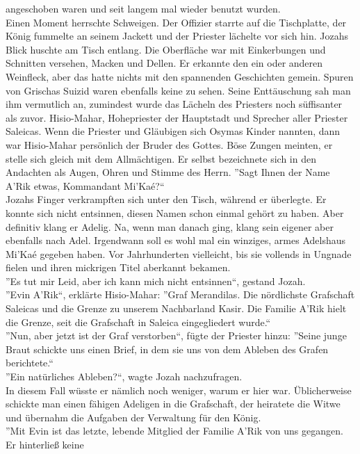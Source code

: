 angeschoben waren und seit langem mal wieder benutzt wurden. \\
Einen Moment herrschte Schweigen. Der Offizier starrte auf die Tischplatte, der König fummelte an 
seinem Jackett und der Priester lächelte vor sich hin. Jozahs Blick huschte am Tisch entlang. Die 
Oberfläche war mit Einkerbungen und Schnitten versehen, Macken und Dellen. Er erkannte den ein oder 
anderen Weinfleck, aber das hatte nichts mit den spannenden Geschichten gemein. Spuren von Grischas 
Suizid waren ebenfalls keine zu sehen. Seine Enttäuschung sah man ihm vermutlich an, zumindest 
wurde das Lächeln des Priesters noch süffisanter als zuvor. Hisio-Mahar, Hohepriester der 
Hauptstadt und Sprecher aller Priester Saleicas. Wenn die Priester und Gläubigen sich Osymas Kinder 
nannten, dann war Hisio-Mahar persönlich der Bruder des Gottes. Böse Zungen meinten, er stelle sich 
gleich mit dem Allmächtigen. Er selbst bezeichnete sich in den Andachten als Augen, Ohren und Stimme 
des Herrn. ''Sagt Ihnen der Name A'Rik etwas, Kommandant Mi'Kaé?``\\
Jozahs Finger verkrampften sich unter den Tisch, während er überlegte. Er konnte sich nicht 
entsinnen, diesen Namen schon einmal gehört zu haben. Aber definitiv klang er Adelig. Na, wenn man 
danach ging, klang sein eigener aber ebenfalls nach Adel. Irgendwann soll es wohl mal ein winziges, 
armes Adelshaus Mi'Kaé gegeben haben. Vor Jahrhunderten vielleicht, bis sie vollends in Ungnade 
fielen und ihren mickrigen Titel aberkannt bekamen.\\
''Es tut mir Leid, aber ich kann mich nicht entsinnen``, gestand Jozah.\\
''Evin A'Rik``, erklärte Hisio-Mahar: ''Graf Merandilas. Die nördlichste Grafschaft Saleicas und 
die Grenze zu unserem Nachbarland Kasir. Die Familie A'Rik hielt die Grenze, seit die Grafschaft 
in Saleica eingegliedert wurde.``\\
''Nun, aber jetzt ist der Graf verstorben``, fügte der Priester hinzu: ''Seine junge Braut schickte 
uns einen Brief, in dem sie uns von dem Ableben des Grafen berichtete.``\\
''Ein natürliches Ableben?``, wagte Jozah nachzufragen.\\
In diesem Fall wüsste er nämlich noch weniger, warum er hier war. Üblicherweise schickte man einen 
fähigen Adeligen in die Grafschaft, der heiratete die Witwe und übernahm die Aufgaben der 
Verwaltung für den König.\\
''Mit Evin ist das letzte, lebende Mitglied der Familie A'Rik von uns gegangen. Er hinterließ keine 
